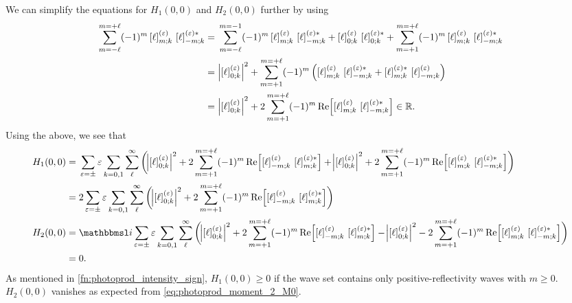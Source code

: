We can simplify the equations for $H_1(0, 0)$ and $H_2(0, 0)$ further
by using
\begin{align}
  \sum_{m = -\ell}^{m = +\ell}
  (-1)^m \sBrk{\ell}^{(\refl)}_{m; k}\, \sBrk{\ell}^{(\refl) *}_{{-m}; k}
  ={}& \sum_{m = -\ell}^{m = -1}
  (-1)^m \sBrk{\ell}^{(\refl)}_{m; k}\, \sBrk{\ell}^{(\refl) *}_{{-m}; k}
  + \sBrk{\ell}^{(\refl)}_{0; k}\, \sBrk{\ell}^{(\refl) *}_{0; k}
  + \sum_{m = +1}^{m = +\ell}
  (-1)^m \sBrk{\ell}^{(\refl)}_{m; k}\, \sBrk{\ell}^{(\refl) *}_{{-m}; k} \notag
  \\
  ={}& \Abs[2]{\sBrk{\ell}^{(\refl)}_{0; k}}^2
  + \sum_{m = +1}^{m = +\ell}
  (-1)^m \rBrk[2]{\sBrk{\ell}^{(\refl)}_{m; k}\, \sBrk{\ell}^{(\refl) *}_{{-m}; k} + \sBrk{\ell}^{(\refl) *}_{m; k}\, \sBrk{\ell}^{(\refl)}_{{-m}; k}} \notag
  \\
  ={}& \Abs[2]{\sBrk{\ell}^{(\refl)}_{0; k}}^2
  + 2 \sum_{m = +1}^{m = +\ell}
  (-1)^m \Re[2]{\sBrk{\ell}^{(\refl)}_{m; k}\, \sBrk{\ell}^{(\refl) *}_{{-m}; k}}
  \in \mathbb{R}.
\end{align}
Using the above, we see that
\begin{align}
  H_1(0, 0)
  ={}& \sum_{\refl = \pm} \refl \sum_{k = 0, 1} \sum_{\ell}^\infty
  \rBrk[3]{\Abs[2]{\sBrk{\ell}^{(\refl)}_{0; k}}^2
  + 2 \sum_{m = +1}^{m = +\ell}
  (-1)^m \Re[2]{\sBrk{\ell}^{(\refl)}_{{-m}; k}\, \sBrk{\ell}^{(\refl) *}_{m; k}}
  + \Abs[2]{\sBrk{\ell}^{(\refl)}_{0; k}}^2
  + 2 \sum_{m = +1}^{m = +\ell}
  (-1)^m \Re[2]{\sBrk{\ell}^{(\refl)}_{m; k}\, \sBrk{\ell}^{(\refl) *}_{{-m}; k}}} \notag
  \\
  ={}& 2 \sum_{\refl = \pm} \refl \sum_{k = 0, 1} \sum_{\ell}^\infty
  \rBrk[3]{\Abs[2]{\sBrk{\ell}^{(\refl)}_{0; k}}^2
  + 2 \sum_{m = +1}^{m = +\ell}
  (-1)^m \Re[2]{\sBrk{\ell}^{(\refl)}_{{-m}; k}\, \sBrk{\ell}^{(\refl) *}_{m; k}}}
  \\
  H_2(0, 0)
  ={}& \imag \sum_{\refl = \pm} \refl \sum_{k = 0, 1} \sum_{\ell}^\infty
  \rBrk[3]{\Abs[2]{\sBrk{\ell}^{(\refl)}_{0; k}}^2
  + 2 \sum_{m = +1}^{m = +\ell}
  (-1)^m \Re[2]{\sBrk{\ell}^{(\refl)}_{{-m}; k}\, \sBrk{\ell}^{(\refl) *}_{m; k}}
  - \Abs[2]{\sBrk{\ell}^{(\refl)}_{0; k}}^2
  - 2 \sum_{m = +1}^{m = +\ell}
  (-1)^m \Re[2]{\sBrk{\ell}^{(\refl)}_{m; k}\, \sBrk{\ell}^{(\refl) *}_{{-m}; k}}} \notag
  \\
  ={}& 0.
\end{align}
As mentioned in \cref{fn:photoprod_intensity_sign}, $H_1(0, 0) \geq 0$
if the wave set contains only positive-reflectivity waves with $m \geq
0$.  $H_2(0, 0)$ vanishes as expected from
\cref{eq:photoprod_moment_2_M0}.



